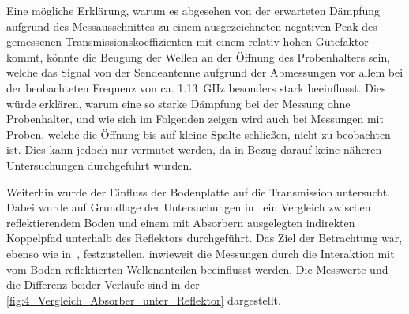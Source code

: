 Eine mögliche Erklärung, warum es abgesehen von der erwarteten Dämpfung aufgrund des Messausschnittes zu einem ausgezeichneten negativen Peak des gemessenen Transmissionskoeffizienten mit einem relativ hohen Gütefaktor kommt, könnte die Beugung der Wellen an der Öffnung des Probenhalters sein, welche das Signal von der Sendeantenne aufgrund der Abmessungen vor allem bei der beobachteten Frequenz von ca. \SI{1,13}{\giga\hertz} besonders stark beeinflusst. Dies würde erklären, warum eine so starke Dämpfung bei der Messung ohne Probenhalter, und wie sich im Folgenden zeigen wird auch bei Messungen mit Proben, welche die Öffnung bis auf kleine Spalte schließen, nicht zu beobachten ist. Dies kann jedoch nur vermutet werden, da in Bezug darauf keine näheren Untersuchungen durchgeführt wurden. 
\par
\vspace{\linespace}
Weiterhin wurde der Einfluss der Bodenplatte auf die Transmission untersucht. Dabei wurde auf Grundlage der Untersuchungen in~\cite{Vergleich_Absorberhalle_Groundplane} ein Vergleich zwischen reflektierendem Boden und einem mit Absorbern ausgelegten indirekten Koppelpfad unterhalb des Reflektors durchgeführt. Das Ziel der Betrachtung war, ebenso wie in~\cite{Vergleich_Absorberhalle_Groundplane}, festzustellen, inwieweit die Messungen durch die Interaktion mit vom Boden reflektierten Wellenanteilen beeinflusst werden. Die Messwerte und die Differenz beider Verläufe sind in der \Abb\ref{fig:4_Vergleich_Absorber_unter_Reflektor} dargestellt.
\par
\vspace{\linespace}

